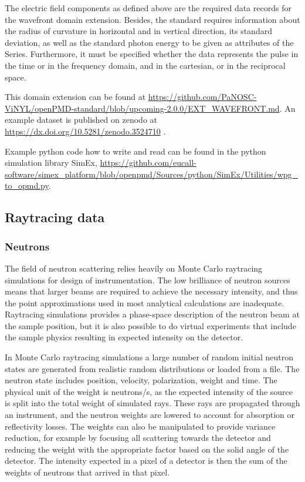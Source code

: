 \documentclass[11pt, a4paper]{article}
\begin{document}
The electric field components as defined above are the required data records for the wavefront domain extension.
Besides, the standard requires information about the radius of curvature in horizontal and in vertical direction, its
standard deviation, as well as the standard photon energy to be given as attributes of the Series. Furthermore, it must
be specified whether the data represents the pulse in the time or in the frequency domain, and in the cartesian, or in
the reciprocal space.

This domain extension can be found at \url{https://github.com/PaNOSC-ViNYL/openPMD-standard/blob/upcoming-2.0.0/EXT_WAVEFRONT.md}.
An example dataset is published on zenodo at \url{https://dx.doi.org/10.5281/zenodo.3524710}
\cite{Fortmann-Grote:zenodo2019}.

Example python code how to write and read can be found in the python simulation library SimEx,
\url{https://github.com/eucall-software/simex_platform/blob/openpmd/Sources/python/SimEx/Utilities/wpg_to_opmd.py}.

\subsection{Raytracing data}
\subsubsection{Neutrons}
The field of neutron scattering relies heavily on Monte Carlo raytracing simulations for design of instrumentation. The low 
brilliance of neutron sources means that larger beams are required to achieve the necessary intensity, and thus the point 
approximations used in most analytical calculations are inadequate. Raytracing simulations provides a phase-space description 
of the neutron beam at the sample position, but it is also possible to do virtual experiments that include the sample physics 
resulting in expected intensity on the detector.

In Monte Carlo raytracing simulations a large number of random initial neutron states are generated from realistic random 
distributions or loaded from a file. The neutron state includes position, velocity, polarization, weight and time. The 
physical unit of the weight is neutrons/s, as the expected intensity of the source is split into the total weight of simulated 
rays. These rays are propagated through an instrument, and the neutron weights are lowered to account for  absorption or 
reflectivity losses. The weights can also be manipulated to provide variance reduction, for example by focusing all scattering 
towards the detector and reducing the weight with the appropriate factor based on the solid angle of the detector. The 
intensity expected in a pixel of a detector is then the sum of the weights of neutrons that arrived in that pixel. 
\end{document}
